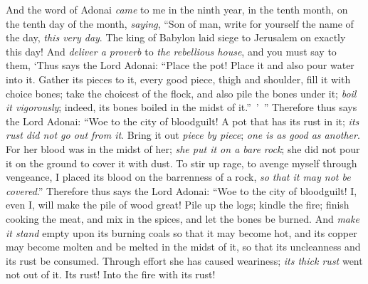 \begin{biblechapter} %
 And the word of Adonai \textit{came} to me in the ninth year, in the tenth month, on the tenth day of the month, \textit{saying},
\verse “Son of man, write for yourself the name of the day, \textit{this very day}. The king of Babylon laid siege to Jerusalem on exactly this day!
\verse And \textit{deliver a proverb} to \textit{the rebellious house}, and you must say to them, ‘Thus says the Lord Adonai: “Place the pot! Place it and also pour water into it.
\verse Gather its pieces to it, every good piece, thigh and shoulder, fill it with choice bones;
\verse take the choicest of the flock, and also pile the bones under it; \textit{boil it vigorously}; indeed, its bones boiled in the midst of it.” ’ ”
\verse Therefore thus says the Lord Adonai: “Woe to the city of bloodguilt! A pot that has its rust in it; \textit{its rust did not go out from it}. Bring it out \textit{piece by piece}; \textit{one is as good as another}.
\verse For her blood was in the midst of her; \textit{she put it on a bare rock}; she did not pour it on the ground to cover it with dust.
\verse To stir up rage, to avenge myself through vengeance, I placed its blood on the barrenness of a rock, \textit{so that it may not be covered}.”
\verse Therefore thus says the Lord Adonai: “Woe to the city of bloodguilt! I, even I, will make the pile of wood great!
\verse Pile up the logs; kindle the fire; finish cooking the meat, and mix in the spices, and let the bones be burned.
\verse And \textit{make it stand} empty upon its burning coals so that it may become hot, and its copper may become molten and be melted in the midst of it, so that its uncleanness and its rust be consumed.
\verse Through effort she has caused weariness; \textit{its thick rust} went not out of it. Its rust! Into the fire with its rust!

\end{biblechapter}
